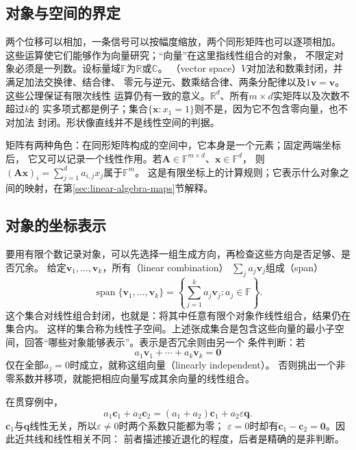 \subsection{对象与空间的界定}
\label{sec:linear-algebra-objects}

两个位移可以相加，一条信号可以按幅度缩放，两个同形矩阵也可以逐项相加。
这些运算使它们能够作为向量研究；“向量”在这里指线性组合的对象，
不限定对象必须是一列数。设标量域$\mathbb F$为$\mathbb R$或$\mathbb C$。
（vector space）$V$对加法和数乘封闭，并满足加法交换律、结合律、
零元与逆元、数乘结合律、两条分配律以及$1\bm v=\bm v$。这些公理保证有限次线性
运算仍有一致的意义。$\mathbb R^d$、所有$m\times d$实矩阵以及次数不超过$k$的
实多项式都是例子；集合$\{\bm x:x_1=1\}$则不是，因为它不包含零向量，也不对加法
封闭。形状像直线并不是线性空间的判据。


矩阵有两种角色：在同形矩阵构成的空间中，它本身是一个元素；固定两端坐标后，
它又可以记录一个线性作用。若$\bm A\in\mathbb F^{m\times d}$、$\bm x\in\mathbb F^d$，
则$(\bm A\bm x)_i=\sum_{j=1}^d a_{i,j}x_j$属于$\mathbb F^m$。
这是有限坐标上的计算规则；它表示什么对象之间的映射，在第\ref{sec:linear-algebra-maps}节解释。

\subsection{对象的坐标表示}
\label{sec:linear-algebra-coordinates}

要用有限个数记录对象，可以先选择一组生成方向，再检查这些方向是否足够、是否冗余。
给定$\bm v_1,\ldots,\bm v_k$，所有（linear combination）
$\sum_j a_j\bm v_j$组成（span）
\[
 \operatorname{span}\{\bm v_1,\ldots,\bm v_k\}
 =\left\{\sum_{j=1}^k a_j\bm v_j:a_j\in\mathbb F\right\}.
\]
这个集合对线性组合封闭，也就是：将其中任意有限个对象作线性组合，结果仍在集合内。
这样的集合称为线性子空间。上述张成集合是包含这些向量的最小子空间，回答“哪些对象能够表示”。表示是否冗余则由另一个
条件判断：若
\begin{equation}
 a_1\bm v_1+\cdots+a_k\bm v_k=\bm0
 \label{eq:linear-algebra-independence-relation}
\end{equation}
仅在全部$a_j=0$时成立，就称这组向量（linearly independent）。
否则挑出一个非零系数并移项，就能把相应向量写成其余向量的线性组合。

在贯穿例中，
\[
 a_1\bm c_1+a_2\bm c_2=(a_1+a_2)\bm c_1+a_2\varepsilon\bm q.
\]
$\bm c_1$与$\bm q$线性无关，所以$\varepsilon\neq0$时两个系数只能都为零；
$\varepsilon=0$时却有$\bm c_1-\bm c_2=\bm0$。因此近共线和线性相关不同：
前者描述接近退化的程度，后者是精确的是非判断。

